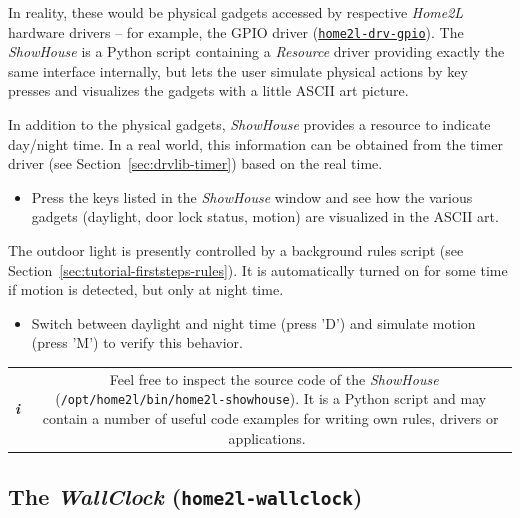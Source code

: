 \documentclass[12pt,english,parskip=half]{scrreprt}
\newcommand{\infobox}[1]{
  \hfill
  \setlength\arrayrulewidth{1pt}
  \begin{tabular}[t]{c|c|}
    \parbox{1.8em}{\hfill\textit{\Huge\textbf{i}\,}}
    &
    \,\parbox{0.89\linewidth}{\setlength{\parskip}{0.5em}#1}\,
  \end{tabular}
  \par
}
\newcommand{\idx}[1]{#1\index{#1}}
\newcommand{\toolref}[1]{\hyperref[tool:#1]{\texttt{\idx{#1}}}}
\begin{document}
In reality, these would be physical gadgets accessed by respective
\emph{Home2L} hardware drivers -- for example, the GPIO driver (\toolref{home2l-drv-gpio}).
The \emph{ShowHouse} is a Python script containing a \emph{Resource}
driver providing exactly the same interface internally, but lets the
user simulate physical actions by key presses and visualizes the gadgets
with a little ASCII art picture.

In addition to the physical gadgets, \emph{ShowHouse} provides
a resource to indicate day/night time. In a real world, this information can
be obtained from the timer driver (see Section~\ref{sec:drvlib-timer})
based on the real time.

\begin{itemize}[$\blacktriangleright$]

\item
  Press the keys listed in the \emph{ShowHouse} window and see how the various gadgets
  (daylight, door lock status, motion) are visualized in the ASCII art.

\end{itemize}

The outdoor light is presently controlled by a background rules script
(see Section~\ref{sec:tutorial-firststeps-rules}).
It is automatically turned on for some time if motion is detected, but only at night time.

\begin{itemize}[$\blacktriangleright$]

\item
  Switch between daylight and night time (press 'D') and simulate motion
  (press 'M') to verify this behavior.

\end{itemize}


\infobox{
  Feel free to inspect the source code of the \emph{ShowHouse}
  (\texttt{/opt/home2l/bin/home2l-showhouse}). It is a Python script and may contain
  a number of useful code examples for writing own rules, drivers or applications.
}



\subsection{The \emph{WallClock} (\texttt{home2l-wallclock})}
\label{sec:tutorial-firststeps-wallclock}
\end{document}
